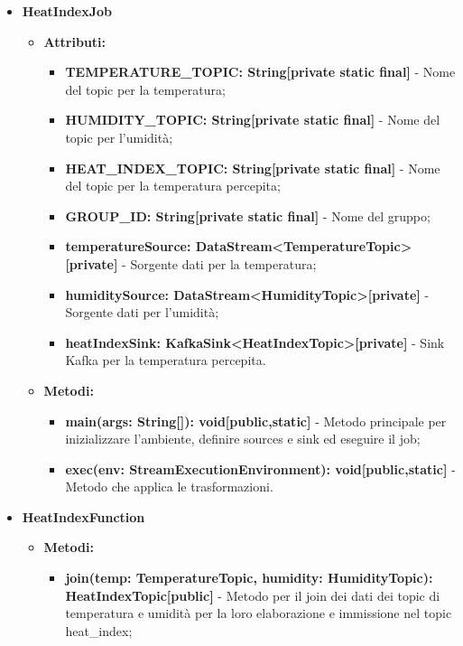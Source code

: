 \documentclass[8pt]{article}
\begin{document}
\begin{itemize}
    \item \textbf{HeatIndexJob}
    \begin{itemize}
        \item \textbf{Attributi:}
        \begin{itemize}
            \item \textbf{TEMPERATURE\_TOPIC: String[private static final]} - Nome del topic per la temperatura;
            \item \textbf{HUMIDITY\_TOPIC: String[private static final]} - Nome del topic per l'umidità;
            \item \textbf{HEAT\_INDEX\_TOPIC: String[private static final]} - Nome del topic per la temperatura percepita;
            \item \textbf{GROUP\_ID: String[private static final]} - Nome del gruppo;
            \item \textbf{temperatureSource: DataStream<TemperatureTopic>[private]} - Sorgente dati per la temperatura;
            \item \textbf{humiditySource: DataStream<HumidityTopic>[private]} - Sorgente dati per l'umidità;
            \item \textbf{heatIndexSink: KafkaSink<HeatIndexTopic>[private]} - Sink Kafka per la temperatura percepita.
        \end{itemize}
    \end{itemize}
    \begin{itemize}
        \item \textbf{Metodi:}
        \begin{itemize}
            \item \textbf{main(args: String[]): void[public,static]} - Metodo principale per inizializzare l'ambiente, definire sources e sink ed eseguire il job;
            \item \textbf{exec(env: StreamExecutionEnvironment): void[public,static]} - Metodo che applica le trasformazioni.
        \end{itemize}
    \end{itemize}
    \item \textbf{HeatIndexFunction}
    \begin{itemize}
        \item \textbf{Metodi:}
        \begin{itemize}
            \item \textbf{join(temp: TemperatureTopic, humidity: HumidityTopic): HeatIndexTopic[public]} - Metodo per il join dei dati dei topic di temperatura e umidità per la loro elaborazione e immissione nel topic heat\_index;

\end{itemize}
\end{itemize}
\end{itemize}
\end{document}
